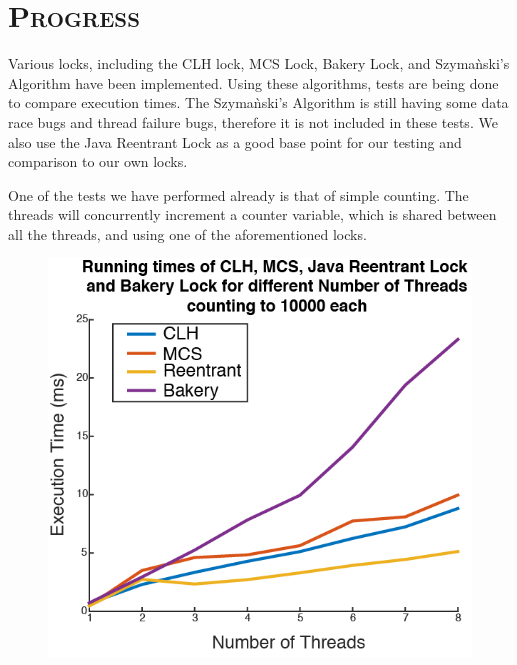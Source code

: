 \documentclass[CheckpointReport.tex]{subfiles}
\begin{document}
\bigskip

\section*{\textsc{\Large Progress}}
Various locks, including the CLH lock, MCS Lock, Bakery Lock, and Szyma\`{n}ski's Algorithm have been implemented.  Using these algorithms, tests are being done to compare execution times.  The Szyma\`{n}ski's Algorithm is still having some data race bugs and thread failure bugs, therefore it is not included in these tests.  We also use the Java Reentrant Lock as a good base point for our testing and comparison to our own locks.  

One of the tests we have performed already is that of simple counting.  The threads will concurrently increment a counter variable, which is shared between all the threads, and using one of the aforementioned locks.

\begin{figure}[H]
	\centering
	\includegraphics[]{runningTime.png}
\end{figure}
\end{document}
